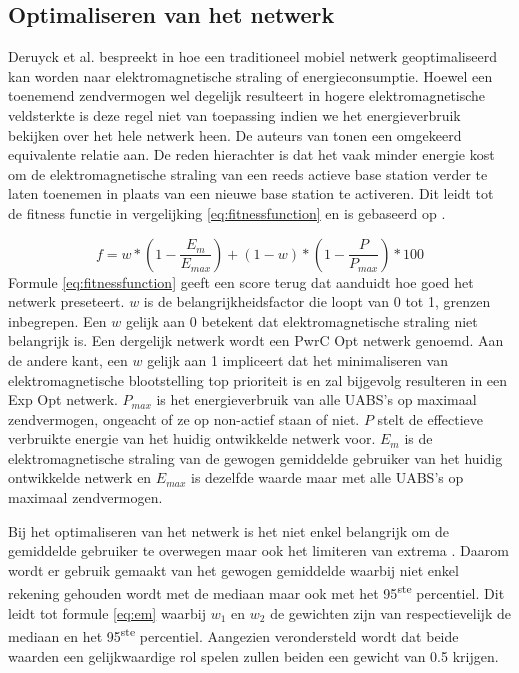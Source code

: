 \documentclass[twocolumn]{phdsymp_dutch}
\begin{document}
\subsection{Optimaliseren van het netwerk}

Deruyck et al. bespreekt in \cite{J1} hoe een traditioneel mobiel netwerk geoptimaliseerd kan worden naar elektromagnetische straling of energieconsumptie.
Hoewel een toenemend zendvermogen wel degelijk resulteert in hogere elektromagnetische veldsterkte is deze regel niet van 
toepassing indien we het energieverbruik bekijken over het hele netwerk heen. 
De auteurs van \cite{J1} tonen een omgekeerd equivalente relatie aan.
De reden hierachter is dat het vaak minder energie kost om de elektromagnetische straling van een reeds actieve base station 
verder te laten toenemen in plaats van  een nieuwe base station te activeren. Dit leidt tot de fitness functie 
in vergelijking \ref{eq:fitnessfunction} en is gebaseerd op \cite{J1}.

\begin{equation} 
f = w * \left(1 - \frac{E_m}{E_{max}}\right) + (1 - w)*\left(1 - \frac{P}{P_{max}}\right) * 100
\label{eq:fitnessfunction}
\end{equation}
\newline
Formule \ref{eq:fitnessfunction} geeft een score terug dat aanduidt hoe goed het netwerk preseteert.
$w$ is de belangrijkheidsfactor die loopt van 0 tot 1, grenzen inbegrepen. Een $w$ gelijk aan 0 betekent
dat elektromagnetische straling niet belangrijk is. Een dergelijk netwerk wordt een \gls{PwrC Opt} netwerk genoemd.
Aan de andere kant, een $w$ gelijk aan 1 impliceert dat het minimaliseren van elektromagnetische blootstelling top prioriteit is
en zal bijgevolg resulteren in een \gls{Exp Opt} netwerk. $P_{max}$ is het energieverbruik van alle \gls{UABS}'s op maximaal 
zendvermogen, ongeacht of ze 
op non-actief staan of niet.
$P$ stelt de effectieve verbruikte energie van het huidig ontwikkelde netwerk voor.
$E_m$ is de elektromagnetische straling van de gewogen gemiddelde gebruiker van het huidig ontwikkelde netwerk en 
$E_{max}$ is dezelfde waarde maar met alle \gls{UABS}'s op maximaal zendvermogen.

Bij het optimaliseren van het netwerk is het niet enkel belangrijk om  de gemiddelde gebruiker te overwegen maar ook het limiteren 
van extrema \cite{J1}. 
Daarom wordt er gebruik gemaakt van het gewogen gemiddelde waarbij niet enkel rekening gehouden wordt met de mediaan maar ook 
met het 95\textsuperscript{ste} percentiel. Dit leidt tot formule \ref{eq:em} waarbij 
  $w_1$ en  $w_2$ de gewichten zijn van respectievelijk de mediaan en het 95\textsuperscript{ste} percentiel.
 Aangezien verondersteld wordt dat beide waarden een gelijkwaardige rol spelen zullen beiden een gewicht van 0.5 krijgen. 
\end{document}
